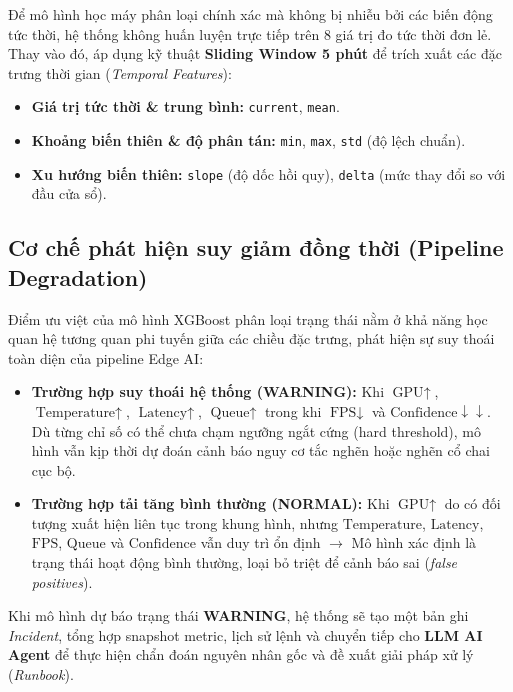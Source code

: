Để mô hình học máy phân loại chính xác mà không bị nhiễu bởi các biến động tức thời, hệ thống không huấn luyện trực tiếp trên 8 giá trị đo tức thời đơn lẻ. Thay vào đó, áp dụng kỹ thuật \textbf{Sliding Window 5 phút} để trích xuất các đặc trưng thời gian (\textit{Temporal Features}):
\begin{itemize}
  \item \textbf{Giá trị tức thời \& trung bình:} \texttt{current}, \texttt{mean}.
  \item \textbf{Khoảng biến thiên \& độ phân tán:} \texttt{min}, \texttt{max}, \texttt{std} (độ lệch chuẩn).
  \item \textbf{Xu hướng biến thiên:} \texttt{slope} (độ dốc hồi quy), \texttt{delta} (mức thay đổi so với đầu cửa sổ).
\end{itemize}

\subsection{Cơ chế phát hiện suy giảm đồng thời (Pipeline Degradation)}

Điểm ưu việt của mô hình XGBoost phân loại trạng thái nằm ở khả năng học quan hệ tương quan phi tuyến giữa các chiều đặc trưng, phát hiện sự suy thoái toàn diện của pipeline Edge AI:
\begin{itemize}
  \item \textbf{Trường hợp suy thoái hệ thống (WARNING):} Khi $\text{GPU} \uparrow$, $\text{Temperature} \uparrow$, $\text{Latency} \uparrow$, $\text{Queue} \uparrow$ trong khi $\text{FPS} \downarrow$ và $\text{Confidence} \downarrow \downarrow$. Dù từng chỉ số có thể chưa chạm ngưỡng ngắt cứng (hard threshold), mô hình vẫn kịp thời dự đoán cảnh báo nguy cơ tắc nghẽn hoặc nghẽn cổ chai cục bộ.
  \item \textbf{Trường hợp tải tăng bình thường (NORMAL):} Khi $\text{GPU} \uparrow$ do có đối tượng xuất hiện liên tục trong khung hình, nhưng $\text{Temperature}$, $\text{Latency}$, $\text{FPS}$, $\text{Queue}$ và $\text{Confidence}$ vẫn duy trì ổn định $\rightarrow$ Mô hình xác định là trạng thái hoạt động bình thường, loại bỏ triệt để cảnh báo sai (\textit{false positives}).
\end{itemize}

Khi mô hình dự báo trạng thái \textbf{WARNING}, hệ thống sẽ tạo một bản ghi \textit{Incident}, tổng hợp snapshot metric, lịch sử lệnh và chuyển tiếp cho \textbf{LLM AI Agent} để thực hiện chẩn đoán nguyên nhân gốc và đề xuất giải pháp xử lý (\textit{Runbook}).